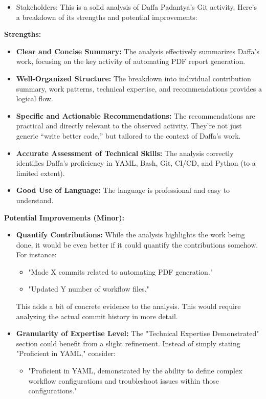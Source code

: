 \documentclass{article}
\begin{document}
\begin{itemize}
 \begin{itemize}
        \item Stakeholders: This is a solid analysis of Daffa Padantya's Git activity.  Here's a breakdown of its strengths and potential improvements:
    \end{itemize}
\textbf{Strengths:}
\begin{itemize}
    \item \textbf{Clear and Concise Summary:}  The analysis effectively summarizes Daffa's work, focusing on the key activity of automating PDF report generation.
    \item \textbf{Well-Organized Structure:}  The breakdown into individual contribution summary, work patterns, technical expertise, and recommendations provides a logical flow.
    \item \textbf{Specific and Actionable Recommendations:}  The recommendations are practical and directly relevant to the observed activity.  They're not just generic ``write better code,'' but tailored to the context of Daffa's work.
    \item \textbf{Accurate Assessment of Technical Skills:}  The analysis correctly identifies Daffa's proficiency in YAML, Bash, Git, CI/CD, and Python (to a limited extent).
    \item \textbf{Good Use of Language:}  The language is professional and easy to understand.
\end{itemize}
\textbf{Potential Improvements (Minor):}

\begin{itemize}
    \item \textbf{Quantify Contributions:} While the analysis highlights the work being done, it would be even better if it could quantify the contributions somehow. For instance:
        \begin{itemize}
            \item "Made X commits related to automating PDF generation."
            \item  "Updated Y number of workflow files."
        \end{itemize}

     This adds a bit of concrete evidence to the analysis. This would require analyzing the actual commit history in more detail.

    \item \textbf{Granularity of Expertise Level:}\textit{} The "Technical Expertise Demonstrated" section could benefit from a slight refinement. Instead of simply stating "Proficient in YAML," consider:
    \begin{itemize}
        \item   "Proficient in YAML, demonstrated by the ability to define complex workflow configurations and troubleshoot issues within those configurations."
    \end{itemize}


\end{itemize}
\end{itemize}
\end{document}
